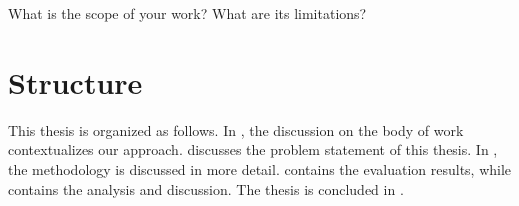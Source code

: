 What is the scope of your work? What are its limitations?

\section{Structure}

This thesis is organized as follows. In , the discussion on the body of work contextualizes our approach.  discusses the problem statement of this thesis. In , the methodology is discussed in more detail.  contains the evaluation results, while  contains the analysis and discussion. The thesis is concluded in .
